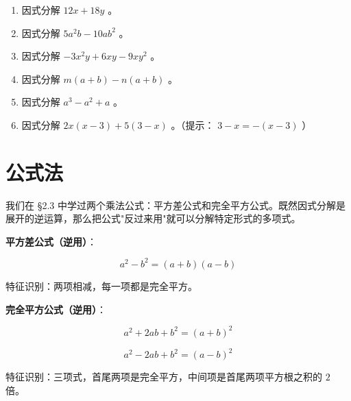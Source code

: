 \begin{practice}


\begin{enumerate}
  \item 因式分解 $12x + 18y$ 。
  \item 因式分解 $5a^2b - 10ab^2$ 。
  \item 因式分解 $-3x^2y + 6xy - 9xy^2$ 。
  \item 因式分解 $m(a + b) - n(a + b)$ 。
  \item 因式分解 $a^3 - a^2 + a$ 。
  \item 因式分解 $2x(x - 3) + 5(3 - x)$ 。（提示： $3 - x = -(x - 3)$ ）
\end{enumerate}


\end{practice}

\section*{公式法}


\begin{explore}


我们在 §2.3 中学过两个乘法公式：平方差公式和完全平方公式。既然因式分解是展开的逆运算，那么把公式"反过来用"就可以分解特定形式的多项式。

\end{explore}

\begin{understand}


\textbf{平方差公式（逆用）}：

\[
a^2 - b^2 = (a + b)(a - b)
\]


特征识别：两项相减，每一项都是完全平方。

\textbf{完全平方公式（逆用）}：

\[
a^2 + 2ab + b^2 = (a + b)^2
\]


\[
a^2 - 2ab + b^2 = (a - b)^2
\]


特征识别：三项式，首尾两项是完全平方，中间项是首尾两项平方根之积的 $2$ 倍。

\end{understand}


